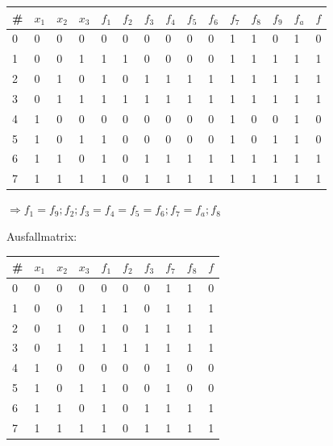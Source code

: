 \documentclass[10pt,a4paper]{scrartcl}
\begin{document}
\begin{tabular}{|l||lll||l|l|l|l|l|l|l|l|l|l||l|}\hline
\# & $x_1$&$x_2$&$x_3$&$f_1$&$f_2$&$f_3$&$f_4$&$f_5$&$f_6$&$f_7$&$f_8$&$f_9$&$f_a$&$f$ \\\hline\hline
0  & 0&0&0            & 0   & 0   & 0   & 0   & 0   & 0   & 1   & 1   & 0   & 1   & 0  \\
1  & 0&0&1            & 1   & 1   & 0   & 0   & 0   & 0   & 1   & 1   & 1   & 1   & 1  \\
2  & 0&1&0            & 1   & 0   & 1   & 1   & 1   & 1   & 1   & 1   & 1   & 1   & 1  \\
3  & 0&1&1            & 1   & 1   & 1   & 1   & 1   & 1   & 1   & 1   & 1   & 1   & 1  \\
4  & 1&0&0            & 0   & 0   & 0   & 0   & 0   & 0   & 1   & 0   & 0   & 1   & 0  \\
5  & 1&0&1            & 1   & 0   & 0   & 0   & 0   & 0   & 1   & 0   & 1   & 1   & 0  \\
6  & 1&1&0            & 1   & 0   & 1   & 1   & 1   & 1   & 1   & 1   & 1   & 1   & 1  \\
7  & 1&1&1            & 1   & 0   & 1   & 1   & 1   & 1   & 1   & 1   & 1   & 1   & 1  \\\hline
\end{tabular}

$\Longrightarrow f_1=f_9 ; f_2 ; f_3=f_4=f_5=f_6 ; f_7=f_a ; f_8$

Ausfallmatrix:

\begin{tabular}{|l||lll||l|l|l|l|l||l|}\hline
\# & $x_1$&$x_2$&$x_3$&$f_1$&$f_2$&$f_3$&$f_7$&$f_8$&$f$ \\\hline\hline
0  & 0&0&0            & 0   & 0   & 0   & 1   & 1   & 0  \\
1  & 0&0&1            & 1   & 1   & 0   & 1   & 1   & 1  \\
2  & 0&1&0            & 1   & 0   & 1   & 1   & 1   & 1  \\
3  & 0&1&1            & 1   & 1   & 1   & 1   & 1   & 1  \\
4  & 1&0&0            & 0   & 0   & 0   & 1   & 0   & 0  \\
5  & 1&0&1            & 1   & 0   & 0   & 1   & 0   & 0  \\
6  & 1&1&0            & 1   & 0   & 1   & 1   & 1   & 1  \\
7  & 1&1&1            & 1   & 0   & 1   & 1   & 1   & 1  \\\hline
\end{tabular}
\end{document}
